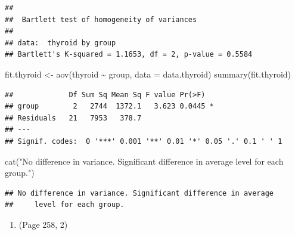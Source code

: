 \documentclass{article}
\newenvironment{Shaded}{\begin{snugshade}}{\end{snugshade}}
\newcommand{\AttributeTok}[1]{\textcolor[rgb]{0.77,0.63,0.00}{#1}}
\newcommand{\FunctionTok}[1]{\textcolor[rgb]{0.00,0.00,0.00}{#1}}
\newcommand{\NormalTok}[1]{#1}
\newcommand{\OtherTok}[1]{\textcolor[rgb]{0.56,0.35,0.01}{#1}}
\newcommand{\SpecialCharTok}[1]{\textcolor[rgb]{0.00,0.00,0.00}{#1}}
\newcommand{\StringTok}[1]{\textcolor[rgb]{0.31,0.60,0.02}{#1}}
\begin{document}
\begin{verbatim}
## 
##  Bartlett test of homogeneity of variances
## 
## data:  thyroid by group
## Bartlett's K-squared = 1.1653, df = 2, p-value = 0.5584
\end{verbatim}

\begin{Shaded}
\begin{Highlighting}[]
\NormalTok{fit.thyroid }\OtherTok{\textless{}{-}} \FunctionTok{aov}\NormalTok{(thyroid }\SpecialCharTok{\textasciitilde{}}\NormalTok{ group, }\AttributeTok{data =}\NormalTok{ data.thyroid)}
\FunctionTok{summary}\NormalTok{(fit.thyroid)}
\end{Highlighting}
\end{Shaded}

\begin{verbatim}
##             Df Sum Sq Mean Sq F value Pr(>F)  
## group        2   2744  1372.1   3.623 0.0445 *
## Residuals   21   7953   378.7                 
## ---
## Signif. codes:  0 '***' 0.001 '**' 0.01 '*' 0.05 '.' 0.1 ' ' 1
\end{verbatim}

\begin{Shaded}
\begin{Highlighting}[]
\FunctionTok{cat}\NormalTok{(}\StringTok{"No difference in variance. Significant difference in average }
\StringTok{    level for each group."}\NormalTok{)}
\end{Highlighting}
\end{Shaded}

\begin{verbatim}
## No difference in variance. Significant difference in average 
##     level for each group.
\end{verbatim}

\begin{enumerate}
\def\labelenumi{\arabic{enumi}.}
\setcounter{enumi}{1}
\tightlist
\item
  (Page 258, 2)
\end{enumerate}
\end{document}
